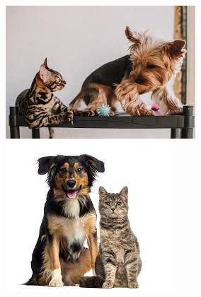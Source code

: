 \begin{figure}
\centering
\begin{minipage}{0.3\textwidth}%
 \includegraphics[width=\textwidth]{Graphics/Images/image_13.jpg}
 \caption{ }
 \label{fig:13}
\end{minipage}%
\begin{minipage}{0.3\textwidth}
 \includegraphics[width=\textwidth]{Graphics/Images/image_14.jpg}
 \caption{ }
 \label{fig:14}
\end{minipage}
\begin{minipage}{0.3\textwidth}

\end{minipage}
\end{figure}
